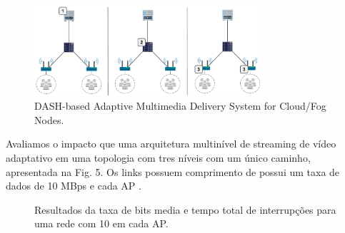 \vspace{0.8cm}
\begin{figure}[htpb]
	\centering
	\includegraphics[width=0.75\textwidth]{img/exp-multi-lvl}
	\caption{DASH-based Adaptive Multimedia Delivery System for Cloud/Fog Nodes.}
	\label{fig:scenario-arch}
\end{figure}


Avaliamos o impacto que uma arquitetura multinível de streaming de vídeo adaptativo em uma topologia com tres níveis com um único caminho, apresentada na Fig. 5. Os links possuem comprimento de possui um taxa de dados de 10 MBps e cada AP .


\vspace{0.8cm}
\begin{figure}[htb]
  \centering
  \hfil \hspace{1cm}
  \caption{Resultados da taxa de bits media e tempo total de interrupções para uma rede com 10 em cada AP.}
  \label{fig:dmm}
\end{figure}

